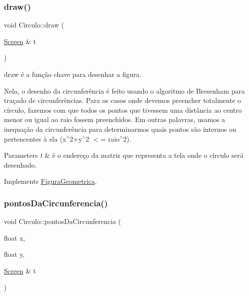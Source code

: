 \subsubsection{\texorpdfstring{draw()}{draw()}}
{\footnotesize\ttfamily void Circulo\+::draw (\begin{DoxyParamCaption}\item[{\mbox{\hyperlink{class_screen}{Screen}} \&}]{t }\end{DoxyParamCaption})\hspace{0.3cm}{\ttfamily [virtual]}}



draw é a função chave para desenhar a figura. 

Nela, o desenho da circunferência é feito usando o algoritmo de Bresenham para traçado de circunferências. Para os casos onde devemos preencher totalmente o círculo, fazemos com que todos os pontos que tivessem uma distância ao centro menor ou igual ao raio fossem preenchidos. Em outras palavras, usamos a inequação da circunferência para determinarmos quais pontos são internos ou pertencentes à ela (x$^\wedge$2+y$^\wedge$2 $<$= raio$^\wedge$2). 
\begin{DoxyParams}{Parameters}
{\em t} & é o endereço da matriz que representa a tela onde o círculo será desenhado. \\
\hline
\end{DoxyParams}


Implements \mbox{\hyperlink{class_figura_geometrica}{Figura\+Geometrica}}.

\mbox{\label{class_circulo_ac7946aa1d6e6a1290d123bdd542a2a90}} 
\subsubsection{\texorpdfstring{pontos\+Da\+Circunferencia()}{pontosDaCircunferencia()}}
{\footnotesize\ttfamily void Circulo\+::pontos\+Da\+Circunferencia (\begin{DoxyParamCaption}\item[{float}]{x,  }\item[{float}]{y,  }\item[{\mbox{\hyperlink{class_screen}{Screen}} \&}]{t }\end{DoxyParamCaption})}



